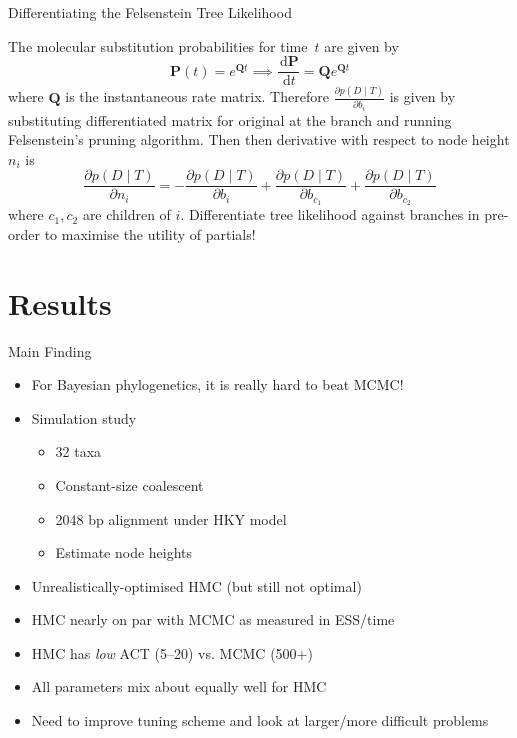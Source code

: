 \documentclass{beamer}
\newcommand{\dd}{\, \text{d}}
\newcommand{\mat}[1]{\ensuremath{\mathbf{#1}}}
\begin{document}
    \begin{frame}{Differentiating the Felsenstein Tree Likelihood}

        The molecular substitution probabilities for time~$t$ are given by
        \begin{equation*}
            \mat{P}\left(t\right) = e^{\mat{Q}t} \implies \frac{\dd \mat{P}}{\dd t} = \mat{Q}e^{\mat{Q}t}
        \end{equation*}
        where $\mat{Q}$ is the instantaneous rate matrix.
        Therefore $\frac{\partial p\left(D\mid T\right)}{\partial b_i}$ is given by substituting differentiated matrix for original at the branch and running Felsenstein's pruning algorithm.
        Then then derivative with respect to node height $n_i$ is
        \begin{equation*}
            \frac{\partial p\left(D\mid T\right)}{\partial n_i} = - \frac{\partial p\left(D\mid T\right)}{\partial b_i} + \frac{\partial p\left(D\mid T\right)}{\partial b_{c_1}} + \frac{\partial p\left(D\mid T\right)}{\partial b_{c_2}}
        \end{equation*}
        where $c_1,c_2$ are children of $i$.
        Differentiate tree likelihood against branches in pre-order to maximise the utility of partials!

    \end{frame}

    \section{Results}

    \begin{frame}{Main Finding}
        \begin{itemize}
            \item For Bayesian phylogenetics, it is really hard to beat MCMC!
            \item Simulation study
            \begin{itemize}
                \item 32 taxa
                \item Constant-size coalescent
                \item 2048 bp alignment under HKY model
                \item Estimate node heights
            \end{itemize}
            \item Unrealistically-optimised HMC (but still not optimal)
            \item HMC nearly on par with MCMC as measured in ESS/time
            \item HMC has \emph{low} ACT (5--20) vs. MCMC (500+)
            \item All parameters mix about equally well for HMC
            \item Need to improve tuning scheme and look at larger/more difficult problems
        \end{itemize}
    \end{frame}
\end{document}
